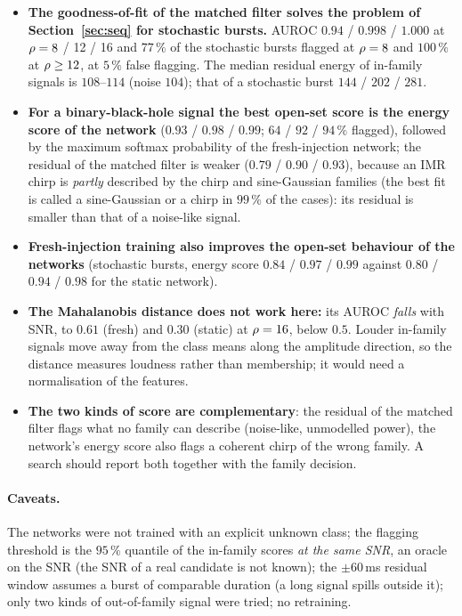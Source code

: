 \begin{itemize}[nosep]
\item \textbf{The goodness-of-fit of the matched filter solves the problem of Section~\ref{sec:seq} for stochastic bursts.} AUROC $0.94$ / $0.998$ / $1.000$ at $\rho=8$ / 12 / 16 and $77\,\%$ of the stochastic bursts flagged at $\rho=8$ and $100\,\%$ at $\rho\ge12$, at $5\,\%$ false flagging. The median residual energy of in-family signals is $108$--$114$ (noise $104$); that of a stochastic burst $144$ / $202$ / $281$.
\item \textbf{For a binary-black-hole signal the best open-set score is the energy score of the network} ($0.93$ / $0.98$ / $0.99$; $64$ / $92$ / $94\,\%$ flagged), followed by the maximum softmax probability of the fresh-injection network; the residual of the matched filter is weaker ($0.79$ / $0.90$ / $0.93$), because an IMR chirp is \emph{partly} described by the chirp and sine-Gaussian families (the best fit is called a sine-Gaussian or a chirp in $99\,\%$ of the cases): its residual is smaller than that of a noise-like signal.
\item \textbf{Fresh-injection training also improves the open-set behaviour of the networks} (stochastic bursts, energy score $0.84$ / $0.97$ / $0.99$ against $0.80$ / $0.94$ / $0.98$ for the static network).
\item \textbf{The Mahalanobis distance does not work here:} its AUROC \emph{falls} with SNR, to $0.61$ (fresh) and $0.30$ (static) at $\rho=16$, below $0.5$. Louder in-family signals move away from the class means along the amplitude direction, so the distance measures loudness rather than membership; it would need a normalisation of the features.
\item \textbf{The two kinds of score are complementary}: the residual of the matched filter flags what no family can describe (noise-like, unmodelled power), the network's energy score also flags a coherent chirp of the wrong family. A search should report both together with the family decision.
\end{itemize}

\paragraph{Caveats.} The networks were not trained with an explicit unknown class; the flagging threshold is the $95\,\%$ quantile of the in-family scores \emph{at the same SNR}, an oracle on the SNR (the SNR of a real candidate is not known); the $\pm60$\,ms residual window assumes a burst of comparable duration (a long signal spills outside it); only two kinds of out-of-family signal were tried; no retraining.
